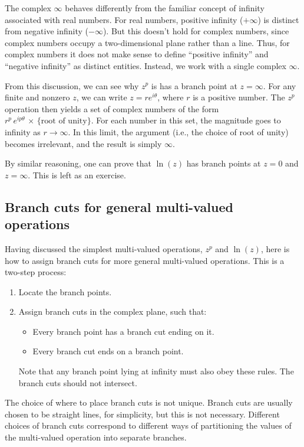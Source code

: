 \documentclass[10pt,a4paper]{article}
\begin{document}
The complex $\infty$ behaves differently from the familiar concept of
infinity associated with real numbers. For real numbers, positive
infinity ($+\infty$) is distinct from negative infinity
($-\infty$). But this doesn't hold for complex numbers, since complex
numbers occupy a two-dimensional plane rather than a line. Thus, for
complex numbers it does not make sense to define ``positive infinity''
and ``negative infinity'' as distinct entities. Instead, we work with
a single complex $\infty$.

From this discussion, we can see why $z^p$ is has a branch point at $z
= \infty$. For any finite and nonzero $z$, we can write $z =
re^{i\theta}$, where $r$ is a positive number. The $z^p$ operation
then yields a set of complex numbers of the form $r^p \,
e^{ip\theta}\,\times\, \{\text{root of unity}\}$.  For each number in
this set, the magnitude goes to infinity as $r \rightarrow \infty$. In
this limit, the argument (i.e., the choice of root of unity) becomes
irrelevant, and the result is simply $\infty$.

By similar reasoning, one can prove that $\ln(z)$ has branch points at
$z = 0$ and $z = \infty$.  This is left as an exercise.

\subsection{Branch cuts for general multi-valued operations}
\label{branch-cuts-for-general-multi-valued-operations}

Having discussed the simplest multi-valued operations, $z^p$ and
$\ln(z)$, here is how to assign branch cuts for more general
multi-valued operations. This is a two-step process:

\begin{enumerate}
\item
Locate the branch points.

\item Assign branch cuts in the complex plane, such that:
  \begin{itemize}
  \item Every branch point has a branch cut ending on it.
  \item Every branch cut ends on a branch point.
  \end{itemize}
  Note that any branch point lying at infinity must also obey these
  rules.  The branch cuts should not intersect.
\end{enumerate}

\noindent
The choice of where to place branch cuts is not unique. Branch cuts are
usually chosen to be straight lines, for simplicity, but this is not
necessary. Different choices of branch cuts correspond to different ways
of partitioning the values of the multi-valued operation into separate
branches.
\end{document}
